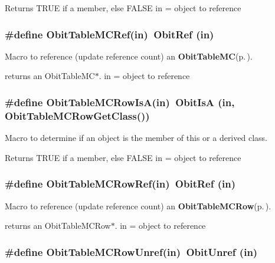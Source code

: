 Returns TRUE if a member, else FALSE in = object to reference 
\subsubsection{\setlength{\rightskip}{0pt plus 5cm}\#define Obit\-Table\-MCRef(in)\ Obit\-Ref (in)}\label{ObitTableMC_8h_a2}


Macro to reference (update reference count) an {\bf Obit\-Table\-MC}{\rm (p.\,\pageref{structObitTableMC})}. 

returns an Obit\-Table\-MC$\ast$. in = object to reference 
\subsubsection{\setlength{\rightskip}{0pt plus 5cm}\#define Obit\-Table\-MCRow\-Is\-A(in)\ Obit\-Is\-A (in, Obit\-Table\-MCRow\-Get\-Class())}\label{ObitTableMC_8h_a6}


Macro to determine if an object is the member of this or a derived class. 

Returns TRUE if a member, else FALSE in = object to reference 
\subsubsection{\setlength{\rightskip}{0pt plus 5cm}\#define Obit\-Table\-MCRow\-Ref(in)\ Obit\-Ref (in)}\label{ObitTableMC_8h_a5}


Macro to reference (update reference count) an {\bf Obit\-Table\-MCRow}{\rm (p.\,\pageref{structObitTableMCRow})}. 

returns an Obit\-Table\-MCRow$\ast$. in = object to reference 
\subsubsection{\setlength{\rightskip}{0pt plus 5cm}\#define Obit\-Table\-MCRow\-Unref(in)\ Obit\-Unref (in)}\label{ObitTableMC_8h_a4}


